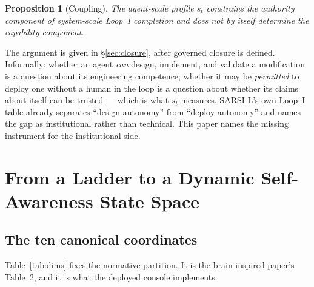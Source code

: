 \documentclass[11pt]{article}
\newtheorem{proposition}{Proposition}
\begin{document}
\begin{proposition}[Coupling]
The agent-scale profile $s_t$ constrains the \emph{authority} component of system-scale Loop~I completion and does not by itself determine the \emph{capability} component.
\end{proposition}

\noindent The argument is given in \S\ref{sec:closure}, after governed closure is defined. Informally: whether an agent \emph{can} design, implement, and validate a modification is a question about its engineering competence; whether it may be \emph{permitted} to deploy one without a human in the loop is a question about whether its claims about itself can be trusted --- which is what $s_t$ measures. SARSI-L's own Loop~I table already separates ``design autonomy'' from ``deploy autonomy'' and names the gap as institutional rather than technical. This paper names the missing instrument for the institutional side.

\section{From a Ladder to a Dynamic Self-Awareness State Space}
\label{sec:statespace}

\subsection{The ten canonical coordinates}
Table~\ref{tab:dims} fixes the normative partition. It is the brain-inspired paper's Table~2, and it is what the deployed console implements.
\end{document}
